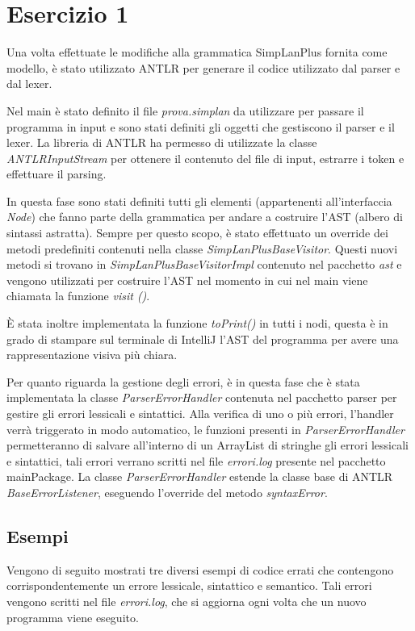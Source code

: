 \section{Esercizio 1}
Una volta effettuate le modifiche alla grammatica SimpLanPlus fornita come modello, è stato utilizzato ANTLR per generare il codice utilizzato dal parser e dal lexer. 

Nel main è stato definito il file \textit{prova.simplan} da utilizzare per passare il programma in input e sono stati definiti gli oggetti che gestiscono il parser e il lexer. La libreria di ANTLR ha permesso di utilizzate la classe \textit{ANTLRInputStream} per ottenere il contenuto del file di input, estrarre i token e effettuare il parsing.

In questa fase sono stati definiti tutti gli elementi (appartenenti all'interfaccia \textit{Node}) che fanno parte della grammatica per andare a costruire l'AST (albero di sintassi astratta). Sempre per questo scopo, è stato effettuato un override dei metodi predefiniti contenuti nella classe \textit{SimpLanPlusBaseVisitor}. Questi nuovi metodi si trovano in \textit{SimpLanPlusBaseVisitorImpl} contenuto nel pacchetto \textit{ast} e vengono utilizzati per costruire l'AST nel momento in cui nel main viene chiamata la funzione \textit{visit ()}. 

È stata inoltre implementata la funzione \textit{toPrint()} in tutti i nodi, questa è in grado di stampare sul terminale di IntelliJ l'AST del programma per avere una rappresentazione visiva più chiara.

Per quanto riguarda la gestione degli errori, è in questa fase che è stata implementata la classe \textit{ParserErrorHandler} contenuta nel pacchetto parser per gestire gli errori lessicali e sintattici.
Alla verifica di uno o più errori, l'handler verrà triggerato in modo automatico, le funzioni presenti in \textit{ParserErrorHandler} permetteranno di salvare all’interno di un ArrayList di stringhe gli errori lessicali e sintattici, tali errori verrano scritti nel file \textit{errori.log} presente nel pacchetto mainPackage. La classe \textit{ParserErrorHandler} estende la classe base di ANTLR \textit{BaseErrorListener}, eseguendo l’override del metodo \textit{syntaxError}.

\subsection{Esempi}
Vengono di seguito mostrati tre diversi esempi di codice errati che contengono corrispondentemente un errore lessicale, sintattico e semantico. Tali errori vengono scritti nel file \textit{errori.log}, che si aggiorna ogni volta che un nuovo programma viene eseguito.

